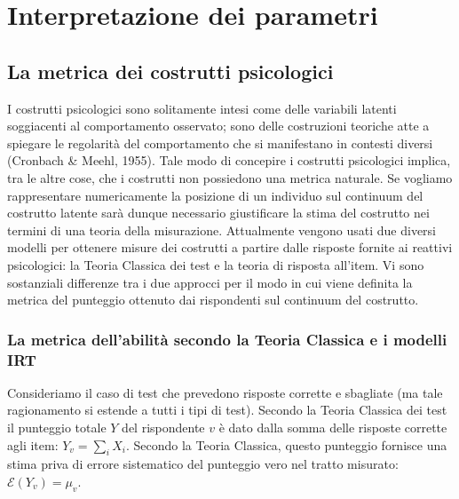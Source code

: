 \chapter{Interpretazione dei parametri}
\label{chapter:interpret_param} 


\section{La metrica dei costrutti psicologici}

I costrutti psicologici sono solitamente intesi come delle variabili latenti soggiacenti al comportamento osservato; sono delle costruzioni teoriche atte a spiegare le regolarità del comportamento che si manifestano in contesti diversi (Cronbach \& Meehl, 1955). 
Tale modo di concepire i costrutti psicologici implica, tra le altre cose, che i costrutti non possiedono una metrica naturale. 
Se vogliamo rappresentare numericamente la posizione di un individuo sul continuum del costrutto latente sarà dunque necessario giustificare la stima del costrutto nei termini di una teoria della misurazione. 
Attualmente vengono usati due diversi modelli per ottenere misure dei costrutti a partire dalle risposte fornite ai reattivi psicologici: la Teoria Classica dei test e la teoria di risposta all'item. Vi sono sostanziali differenze tra i due approcci per il modo in cui viene definita la metrica del punteggio ottenuto dai rispondenti sul continuum del costrutto.

\subsection{La metrica dell'abilità secondo la Teoria Classica e i modelli IRT}


Consideriamo il caso di test che prevedono risposte corrette e sbagliate (ma tale ragionamento si estende a tutti i tipi di test). Secondo la Teoria Classica dei test il punteggio totale $Y$ del rispondente $v$ è dato dalla somma delle risposte corrette agli item: $Y_v = \sum_i X_i$. Secondo la Teoria Classica, questo punteggio fornisce una stima priva di errore sistematico del punteggio vero nel tratto misurato: $\mathscr{E}(Y_v)=\mu_v$.


